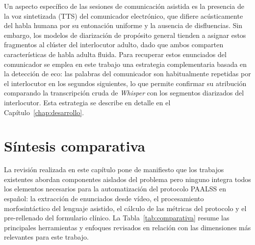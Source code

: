 Un aspecto específico de las sesiones de comunicación asistida es la presencia de la voz
sintetizada (\ac{TTS}) del comunicador electrónico, que difiere acústicamente del habla
humana por su entonación uniforme y la ausencia de disfluencias. Sin embargo, los modelos
de diarización de propósito general tienden a asignar estos fragmentos al clúster del
interlocutor adulto, dado que ambos comparten características de habla adulta fluida.
Para recuperar estos enunciados del comunicador se emplea en este trabajo una estrategia
complementaria basada en la detección de eco: las palabras del comunicador son
habitualmente repetidas por el interlocutor en los segundos siguientes, lo que permite
confirmar su atribución comparando la transcripción cruda de \emph{Whisper} con los
segmentos diarizados del interlocutor. Esta estrategia se describe en detalle en el
Capítulo~\ref{chap:desarrollo}.

\section{Síntesis comparativa}
\label{sec:comparativa}

La revisión realizada en este capítulo pone de manifiesto que los trabajos existentes
abordan componentes aislados del problema pero ninguno integra todos los elementos
necesarios para la automatización del protocolo \ac{PAALSS} en español: la extracción
de enunciados desde vídeo, el procesamiento morfosintáctico del lenguaje asistido, el
cálculo de las métricas del protocolo y el pre-rellenado del formulario clínico. La
Tabla~\ref{tab:comparativa} resume las principales herramientas y enfoques revisados
en relación con las dimensiones más relevantes para este trabajo.

